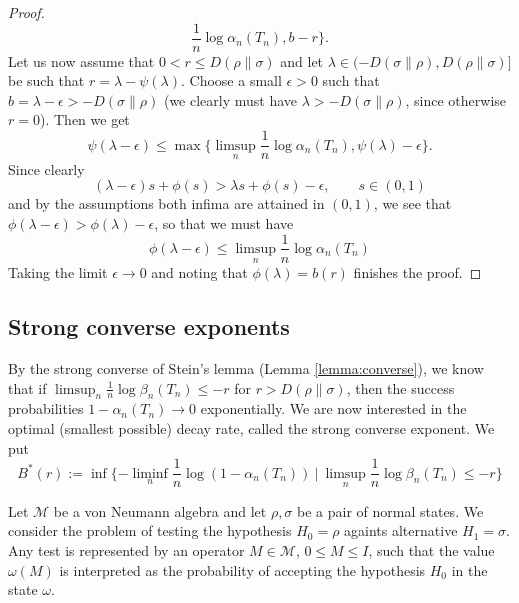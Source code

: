 \documentclass[12pt]{article}
\theoremstyle{definition}
\theoremstyle{remark}
\def\Me{\mathcal M}
\begin{document}
\begin{proof}
\[\frac1n \log \alpha_n(T_n), b-r\}.
\]
Let us now assume that $0< r\le D(\rho\|\sigma)$ and let $\lambda\in
(-D(\sigma\|\rho),D(\rho\|\sigma)]$ be such that $r=\lambda-\psi(\lambda)$. Choose a small
$\epsilon>0$ such that  $b=\lambda-\epsilon>-D(\sigma\|\rho)$ (we clearly must have
$\lambda>- D(\sigma\|\rho)$, since
otherwise $r=0$). Then we get
\[
\psi(\lambda-\epsilon)\le \max\{\limsup_n
\frac1n \log \alpha_n(T_n), \psi(\lambda)-\epsilon\}.
\]
Since clearly
\[
(\lambda-\epsilon)s+\phi(s)>\lambda s+\phi(s)-\epsilon,\qquad s\in (0,1)
\]
and by the assumptions both infima are attained in $(0,1)$, we see that
$\phi(\lambda-\epsilon)>\phi(\lambda)-\epsilon$, so that we must have
\[
\phi(\lambda-\epsilon)\le \limsup_n
\frac1n \log \alpha_n(T_n)
\]
Taking the limit $\epsilon\to 0$ and noting that $\phi(\lambda)=b(r)$ finishes the proof.


\end{proof}


\subsection{Strong converse exponents}

By the strong converse of Stein's lemma (Lemma \ref{lemma:converse}), we know that if
$\limsup_n\frac1n\log \beta_n(T_n)\le -r$ for $r>D(\rho\|\sigma)$, then the success
probabilities $1-\alpha_n(T_n)\to 0$ exponentially. We are now interested in the optimal
(smallest possible) decay rate, called the strong converse exponent. We put
\[
B^*(r):=\inf\{-\liminf_n\frac1n\log(1-\alpha_n(T_n))\ |\ \limsup_n
\frac1n\log\beta_n(T_n)\le -r\}
\]











Let $\Me$ be a von Neumann algebra and let $\rho,\sigma$ be a pair of normal states. 
We consider the problem of testing the
hypothesis $H_0=\rho$ againts alternative $H_1=\sigma$. Any test is represented by an
operator $M\in \Me$, $0\le M\le I$, such that the value $\omega(M)$ is interpreted as the
probability of accepting the hypothesis $H_0$ in the state $\omega$.
\end{document}

